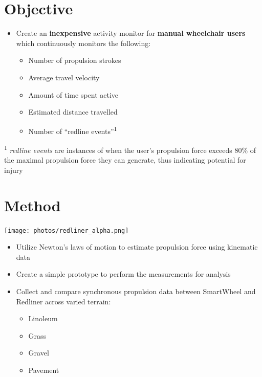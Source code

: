 \documentclass[a0,landscape]{a0poster}
\newenvironment{Figure}
  {\par\medskip\noindent\minipage{\linewidth}}
  {\endminipage\par\medskip}
\begin{document}
\begin{multicols*}{3}
\section*{Objective}
\begin{itemize}
    \item Create an \textbf{inexpensive} activity monitor for \textbf{manual wheelchair users} which continuously monitors the following:
    \begin{itemize}
        \item Number of propulsion strokes
        \item Average travel velocity
        \item Amount of time spent active
        \item Estimated distance travelled
        \item Number of ``redline events''\textsuperscript{1}
    \end{itemize}
\end{itemize}
\textsuperscript{1} \textit{redline events} are instances of when the user's propulsion force exceeds 80\% of the maximal propulsion force they can generate, thus indicating potential for injury

\section*{Method}
\begin{minipage}[t]{0.45\columnwidth}
     \begin{Figure}
        \centering
        \texttt{[image: photos/redliner\_alpha.png]}
        \label{fig:redliner:alpha}
    \end{Figure}
\end{minipage}
\hspace{0.05\columnwidth}%
\begin{minipage}[t]{0.5\columnwidth}
    \begin{itemize}
        \item Utilize Newton's laws of motion to estimate propulsion force using kinematic data
        \item Create a simple prototype to perform the measurements for analysis
        \item Collect and compare synchronous propulsion data between SmartWheel and Redliner across varied terrain:
        \begin{itemize}
            \item Linoleum
            \item Grass
            \item Gravel
            \item Pavement
        \end{itemize}
    \end{itemize}
\end{minipage}


\end{multicols*}
\end{document}
